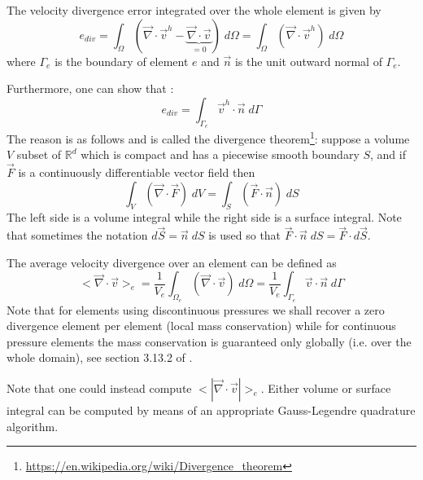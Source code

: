 
The velocity divergence error integrated over the whole element is given by
\begin{equation}
e_{div}= \int_\Omega (\vec\nabla\cdot \vec v^h - \underbrace{\vec\nabla\cdot \vec v}_{=0}  ) \; d\Omega
= \int_\Omega (\vec\nabla\cdot \vec v^h) \; d\Omega
\end{equation}
where $\Gamma_e$ is the boundary of element $e$ and $\vec{n}$ is the unit 
outward normal of $\Gamma_e$.

Furthermore, one can show that \cite{dobo04}:
\[
e_{div} = \int_{\Gamma_e} \vec{v}^h\cdot\vec{n} \;  d\Gamma
\]
The reason is as follows and is called the divergence 
theorem\footnote{\url{https://en.wikipedia.org/wiki/Divergence_theorem}}:
suppose a volume $V$ subset of $\mathbb{R}^d$ which is compact
and has a piecewise smooth boundary $S$, and if $\vec F$ is
a continuously differentiable vector field then
\[
\int_V ( \vec\nabla\cdot\vec F)\; dV = \int_S (\vec F \cdot \vec n)\; dS
\]
The left side is a volume integral while the right side is a surface integral.
Note that sometimes the notation $d\vec S = \vec n \; dS $ is used so that 
$\vec F \cdot \vec n \; dS = \vec F \cdot d\vec S$.

The average velocity divergence over an element can be defined as 
\[
<\vec \nabla \cdot \vec v>_e 
= \frac{1}{V_e} \int_{\Omega_e}  (\vec\nabla\cdot\vec v) \; d\Omega
= \frac{1}{V_e} \int_{\Gamma_e} \vec{v}\cdot\vec{n} \; d\Gamma
\]
Note that for elements using discontinuous pressures we shall 
recover a zero divergence element per element (local mass conservation)
while for continuous pressure elements the mass conservation 
is guaranteed only globally (i.e. over the whole domain), see section 3.13.2 of \cite{grsa}.

Note that one could instead compute $<|\vec\nabla\cdot \vec v|>_e$. Either volume or 
surface integral can be computed by means of an appropriate Gauss-Legendre quadrature algorithm.



